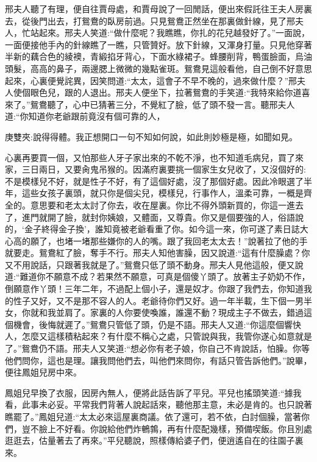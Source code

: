 \begin{parag}
    邢夫人聽了有理，便自往賈母處，和賈母說了一回閒話，便出來假託往王夫人房裏去，從後門出去，打鴛鴦的臥房前過。只見鴛鴦正然坐在那裏做針線，見了邢夫人，忙站起來。邢夫人笑道:“做什麼呢？我瞧瞧，你扎的花兒越發好了。”一面說，一面便接他手內的針線瞧了一瞧，只管贊好。放下針線，又渾身打量。只見他穿著半新的藕合色的綾襖，青緞掐牙背心，下面水綠裙子。蜂腰削背，鴨蛋臉面，烏油頭髮，高高的鼻子，兩邊腮上微微的幾點雀斑。鴛鴦見這般看他，自己倒不好意思起來，心裏便覺詫異，因笑問道:“太太，這會子不早不晚的，過來做什麼？”邢夫人使個眼色兒，跟的人退出。邢夫人便坐下，拉著鴛鴦的手笑道:“我特來給你道喜來了。”鴛鴦聽了，心中已猜著三分，不覺紅了臉，低了頭不發一言。聽邢夫人道:“你知道你老爺跟前竟沒有個可靠的人，\begin{note}庚雙夾:說得得體。我正想開口一句不知如何說，如此則妙極是極，如聞如見。\end{note}心裏再要買一個，又怕那些人牙子家出來的不乾不淨，也不知道毛病兒，買了來家，三日兩日，又要肏鬼吊猴的。因滿府裏要挑一個家生女兒收了，又沒個好的:不是模樣兒不好，就是性子不好，有了這個好處，沒了那個好處。因此冷眼選了半年，這些女孩子裏頭，就只你是個尖兒，模樣兒，行事作人，溫柔可靠，一概是齊全的。意思要和老太太討了你去，收在屋裏。你比不得外頭新買的，你這一進去了，進門就開了臉，就封你姨娘，又體面，又尊貴。你又是個要強的人，俗語說的，‘金子終得金子換’，誰知竟被老爺看重了你。如今這一來，你可遂了素日誌大心高的願了，也堵一堵那些嫌你的人的嘴。跟了我回老太太去！”說著拉了他的手就要走。鴛鴦紅了臉，奪手不行。邢夫人知他害臊，因又說道:“這有什麼臊處？你又不用說話，只跟著我就是了。”鴛鴦只低了頭不動身。邢夫人見他這般，便又說道:“難道你不願意不成？若果然不願意，可真是個傻丫頭了。放著主子奶奶不作，倒願意作丫頭！三年二年，不過配上個小子，還是奴才。你跟了我們去，你知道我的性子又好，又不是那不容人的人。老爺待你們又好。過一年半載，生下個一男半女，你就和我並肩了。家裏的人你要使喚誰，誰還不動？現成主子不做去，錯過這個機會，後悔就遲了。”鴛鴦只管低了頭，仍是不語。邢夫人又道:“你這麼個響快人，怎麼又這樣積粘起來？有什麼不稱心之處，只管說與我，我管你遂心如意就是了。”鴛鴦仍不語。邢夫人又笑道:“想必你有老子娘，你自己不肯說話，怕臊。你等他們問你，這也是理。讓我問他們去，叫他們來問你，有話只管告訴他們。”說畢，便往鳳姐兒房中來。
\end{parag}


\begin{parag}
    鳳姐兒早換了衣服，因房內無人，便將此話告訴了平兒。平兒也搖頭笑道:“據我看，此事未必妥。平常我們背著人說起話來，聽他那主意，未必是肯的。也只說著瞧罷了。”鳳姐兒道:“太太必來這屋裏商議。依了還可，若不依，白討個臊，當著你們，豈不臉上不好看。你說給他們炸鵪鶉，再有什麼配幾樣，預備喫飯。你且別處逛逛去，估量著去了再來。”平兒聽說，照樣傳給婆子們，便逍遙自在的往園子裏來。
\end{parag}


